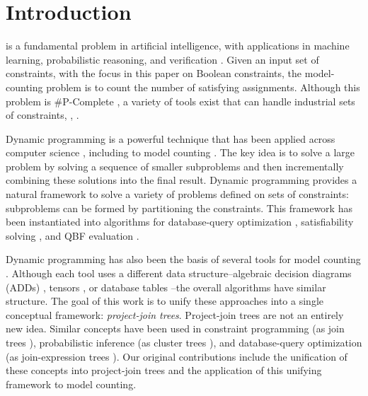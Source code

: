 \section{Introduction}
\label{sec_intro}
 is a fundamental problem in artificial intelligence, with applications in machine learning, probabilistic reasoning, and verification \cite{domshlak2007probabilistic,gomes2009model,naveh2007constraint}.
Given an input set of constraints, with the focus in this paper on Boolean constraints, the model-counting problem is to count the number of satisfying assignments.
Although this problem is \#P-Complete \cite{valiant1979complexity}, a variety of tools exist that can handle industrial sets of constraints, \eg, \cite{sang2004combining,oztok2015top,darwiche2004new,lagniez2017improved}.

Dynamic programming is a powerful technique that has been applied across computer science \cite{bellman1966dynamic}, including to model counting \cite{bacchus2009solving,samer2010algorithms,jegou2016improving}.
The key idea is to solve a large problem by solving a sequence of smaller subproblems and then incrementally combining these solutions into the final result.
Dynamic programming provides a natural framework to solve a variety of problems defined on sets of constraints: subproblems can be formed by partitioning the constraints.
This framework has been instantiated into algorithms for database-query optimization \cite{mcmahan2004projection}, satisfiability solving \cite{uribe1994ordered,aguirre2001random,pan2005symbolic}, and QBF evaluation \cite{charwat2016bdd}.

Dynamic programming has also been the basis of several tools for model counting \cite{dudek2020addmc,dudek2019efficient,dudek2020parallel,fichte2020exploiting}.
Although each tool uses a different data structure--algebraic decision diagrams (ADDs) \cite{dudek2020addmc}, tensors \cite{dudek2019efficient,dudek2020parallel}, or database tables \cite{fichte2020exploiting}--the overall algorithms have similar structure.
The goal of this work is to unify these approaches into a single conceptual framework: \emph{project-join trees}.
Project-join trees are not an entirely new idea.
Similar concepts have been used in constraint programming (as join trees \cite{dechter1989tree}), probabilistic inference (as cluster trees \cite{shachter1994global}), and database-query optimization (as join-expression trees \cite{mcmahan2004projection}).
Our original contributions include the unification of these concepts into project-join trees and the application of this unifying framework to model counting.


